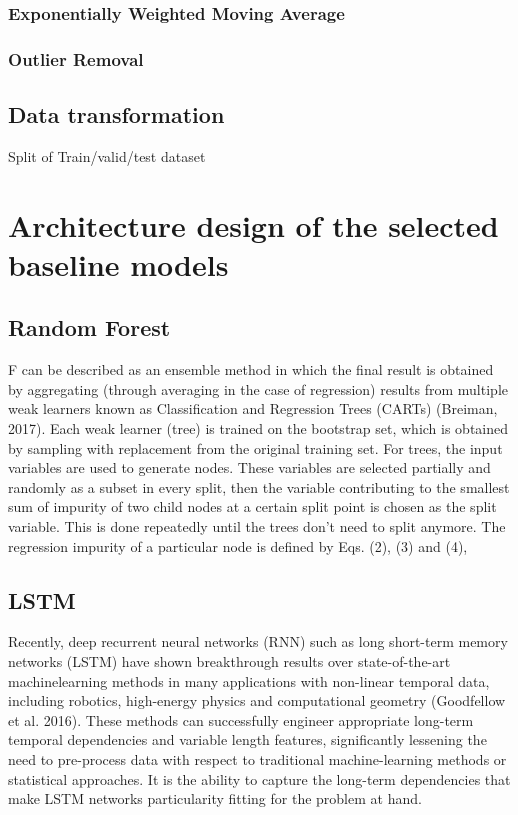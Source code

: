 \subsubsection{Exponentially Weighted Moving Average}
\subsubsection{Outlier Removal}

\subsection{Data transformation}
Split of Train/valid/test dataset 
\section{Architecture design of the selected baseline models}
\subsection{Random Forest}
F can be described as an ensemble method in which the final result is obtained by aggregating (through averaging in the case of regression) results from multiple weak learners known as Classification and Regression Trees (CARTs) (Breiman, 2017). Each weak learner (tree) is trained on the bootstrap set, which is obtained by sampling with replacement from the original training set. For trees, the input variables are used to generate nodes. These variables are selected partially and randomly as a subset in every split, then the variable contributing to the smallest sum of impurity of two child nodes at a certain split point is chosen as the split variable. This is done repeatedly until the trees don't need to split anymore. The regression impurity of a particular node is defined by Eqs. (2), (3) and (4), \citep{wangMachineLearningFramework2021}
\subsection{LSTM}
Recently, deep recurrent neural networks (RNN) such as long short-term memory networks (LSTM) have shown breakthrough results over state-of-the-art machinelearning methods in many applications with non-linear temporal data, including robotics, high-energy physics and computational geometry (Goodfellow et al. 2016). These methods can successfully engineer appropriate long-term temporal dependencies and variable length features, significantly lessening the need to pre-process data with respect to traditional machine-learning methods or statistical approaches. It is the ability to capture the long-term dependencies that make LSTM networks particularity fitting for the problem at hand. 

